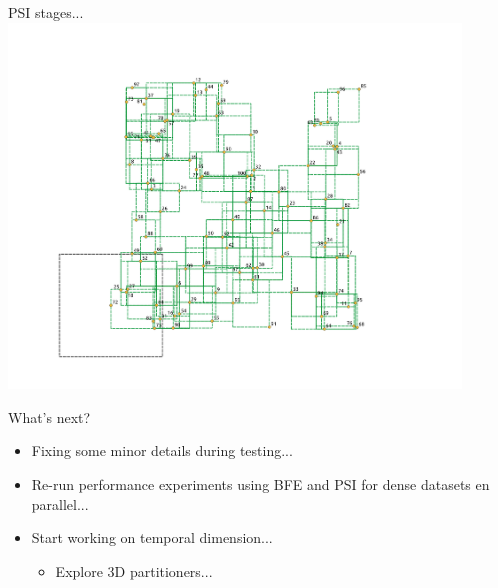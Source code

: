 \documentclass{beamer}
\begin{document}
\begin{frame}{PSI stages...}
    \centering
    \includegraphics[trim={0cm 0cm 0cm 1.5cm}, clip, width=0.9\textwidth]{figures/psi2/p12}
\end{frame}

\begin{frame}{What's next?}
  \begin{itemize}
        \item Fixing some minor details during testing...
        \item Re-run performance experiments using BFE and PSI for dense datasets en parallel...
        \item Start working on temporal dimension...
        \begin{itemize}
            \item Explore 3D partitioners...
        \end{itemize}
  \end{itemize}
\end{frame}
\end{document}

